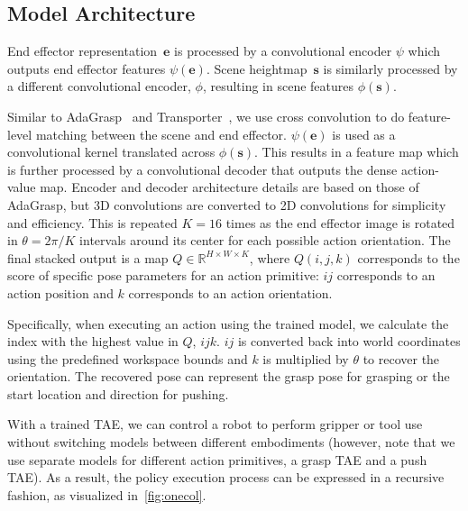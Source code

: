 \documentclass[10pt,twocolumn,letterpaper]{article}
\newcommand{\shane}[1]{{\color{red}{SHANE: #1}}}
\begin{document}




\subsection{Model Architecture}
\label{method_arch}

End effector representation~$\mathbf{e}$ is processed by a convolutional encoder $\psi$ which outputs end effector features $\psi(\mathbf{e})$. Scene heightmap~$\mathbf{s}$ is similarly processed by a different convolutional encoder, $\phi$, resulting in scene features $\phi(\mathbf{s})$.

Similar to AdaGrasp~\cite{xu2020adagrasp} and Transporter~\cite{zeng2020transporter}, we use cross convolution to do feature-level matching between the scene and end effector. $\psi(\mathbf{e})$ is used as a convolutional kernel translated across $\phi(\mathbf{s})$. This results in a feature map which is further processed by a convolutional decoder that outputs the dense action-value map. Encoder and decoder architecture details are based on those of AdaGrasp, but 3D convolutions are converted to 2D convolutions for simplicity and efficiency. This is repeated $K=16$ times as the end effector image is rotated in $\theta=2\pi/K$ intervals around its center for each possible action orientation. The final stacked output is a map $Q \in \mathbb{R}^{H \times W \times K} $, where $Q(i,j,k)$ corresponds to the score of specific pose parameters for an action primitive: $ij$ corresponds to an action position and $k$ corresponds to an action orientation.

Specifically, when executing an action using the trained model, we calculate the index with the highest value in $Q$, $ijk$. $ij$ is converted back into world coordinates using the predefined workspace bounds and $k$ is multiplied by $\theta$ to recover the orientation. The recovered pose can represent the grasp pose for grasping or the start location and direction for pushing.

With a trained TAE, we can control a robot to perform gripper or tool use without switching models between different embodiments (however, note that we use separate models for different action primitives, \eg a grasp TAE and a push TAE). As a result, the policy execution process can be expressed in a recursive fashion, as visualized in~\cref{fig:onecol}.%
\end{document}
